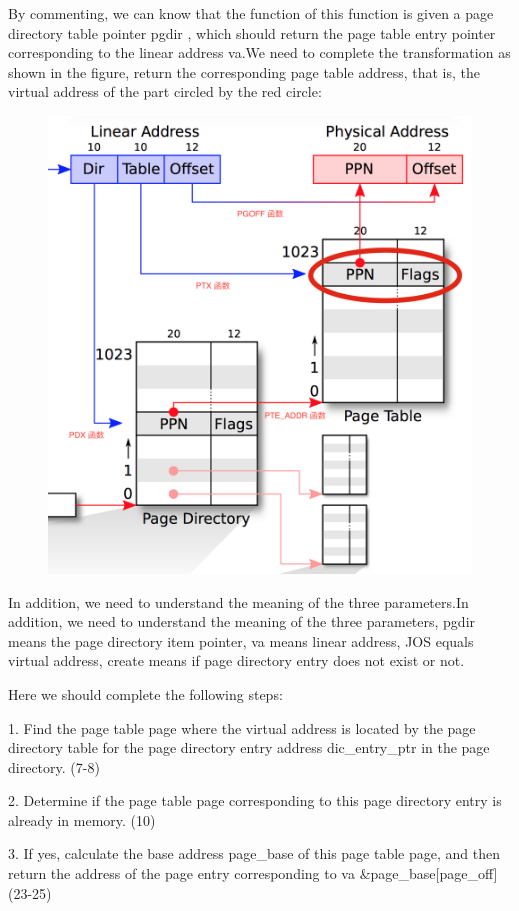 By commenting, we can know that the function of this function is given a page directory table pointer pgdir , which should return the page table entry pointer corresponding to the linear address va.We need to complete the transformation as shown in the figure, return the corresponding page table address, that is, the virtual address of the part circled by the red circle:
\begin{figure}[H]
\centering
\includegraphics[width=0.8\linewidth]{figure/pgdir_walk_purpose}
\end{figure}

In addition, we need to understand the meaning of the three parameters.In addition, we need to understand the meaning of the three parameters, pgdir means the page directory item pointer, va means linear address, JOS equals virtual address, create means if page directory entry does not exist or not.

Here we should complete the following steps:

1. Find the page table page where the virtual address is located by the page directory table for the page directory entry address dic\_entry\_ptr in the page directory. (7-8)

2. Determine if the page table page corresponding to this page directory entry is already in memory. (10)

3. If yes, calculate the base address page\_base of this page table page, and then return the address of the page entry corresponding to va \&page\_base[page\_off] (23-25)


